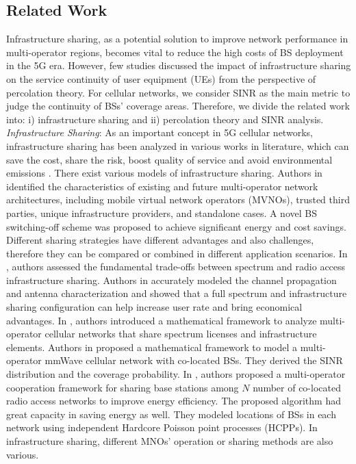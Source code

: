 \documentclass[final]{IEEEtran}
\begin{document}
\subsection{Related Work}
 Infrastructure sharing, as a potential solution to improve network performance in multi-operator regions, becomes vital to reduce the high costs of BS deployment in the 5G era. However, few studies discussed the impact of infrastructure sharing on the service continuity of user equipment (UEs) from the perspective of percolation theory. For cellular networks, we consider SINR as the main metric to judge the continuity of BSs' coverage areas. Therefore, we divide the related work into: i) infrastructure sharing and ii) percolation theory and SINR analysis. \\
\indent \textit{Infrastructure Sharing}: As an important concept in 5G cellular networks, infrastructure sharing has been analyzed in various works in literature, which can save the cost, share the risk, boost quality of service and avoid environmental emissions \cite{dlamini2021remote}. There exist various models of infrastructure sharing. Authors in \cite{7105671} identified the characteristics of existing and future multi-operator network architectures, including mobile virtual network operators (MVNOs), trusted third parties, unique infrastructure providers, and standalone cases. A novel BS switching-off scheme was proposed to achieve significant energy and cost savings. Different sharing strategies have different advantages and also challenges, therefore they can be compared or combined in different application scenarios. 
In \cite{7343930}, authors assessed the fundamental trade-offs between spectrum and radio access infrastructure sharing. 
Authors in \cite{7562085} accurately modeled the channel propagation and antenna characterization and showed that a full spectrum and infrastructure sharing configuration can help increase user rate and bring economical advantages. 
In \cite{7500354}, authors introduced a mathematical framework to analyze multi-operator cellular networks that share spectrum licenses and infrastructure elements. Authors in \cite{8315130} proposed a mathematical framework to model a multi-operator mmWave cellular network with co-located BSs. They derived the SINR distribution and the coverage probability. 
In \cite{8594671}, authors proposed a multi-operator cooperation framework for sharing base stations among $N$ number of co-located radio access networks to improve energy efficiency. 
The proposed algorithm had great capacity in saving energy as well. They modeled locations of BSs in each network using independent Hardcore Poisson point processes (HCPPs). In infrastructure sharing, different MNOs' operation or sharing methods are also various.
\end{document}
